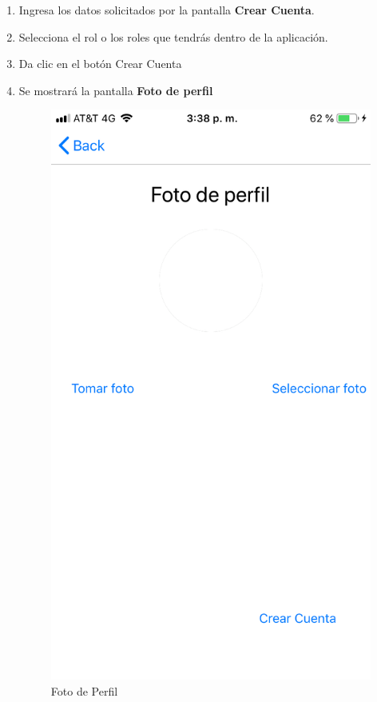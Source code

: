 \begin{enumerate}
	\item Ingresa los datos solicitados por la pantalla \textbf{Crear Cuenta}.
	
	\item Selecciona el rol o los roles que tendrás dentro de la aplicación.
	
	\item Da clic en el botón Crear Cuenta
	
	\item Se mostrará la pantalla \textbf{Foto de perfil}
	\newpage
	\begin{figure}[!htbp]			
		\hypertarget{fig:fotoPerfil}{\hspace{1pt}}
		\begin{center}
			\includegraphics[height=0.4\textheight]{Paciente/RegistrodeCuenta/images/IMG-3182}
			\caption{Foto de Perfil}
			\label{fig:fotoPerfil}
		\end{center}
	\end{figure}


\end{enumerate}
